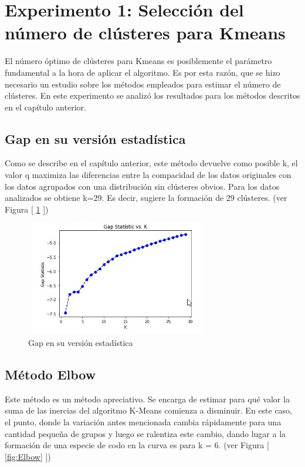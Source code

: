 \section{Experimento 1: Selección del número de clústeres para Kmeans}\label{Experimento1}
El número óptimo de clústeres para Kmeans es posiblemente el parámetro fundamental a la hora de aplicar el algoritmo. Es por esta razón, que se hizo necesario un estudio sobre los métodos empleados para estimar el número de clústeres. En este experimento se analizó los resultados para los métodos descritos en el capítulo anterior.

\subsection{Gap en su versión estadística}
Como se describe en el capítulo anterior, este método devuelve como posible k, el valor q maximiza las diferencias entre la compacidad de los datos originales con los datos agrupados con una distribución sin clústeres obvios. Para los datos analizados se obtiene k=29. Es decir, sugiere la formación de 29 clústeres. (ver Figura [ \ref*{fig:Gap} ])


\begin{figure}[h!]
	\centering
	\includegraphics[width=8cm, height=5cm]{Images/Gap_Static.jpg} 
	\caption{Gap en su versión estadística }
	\label{fig:Gap}
\end{figure}

\subsection{Método Elbow}
Este método es un método apreciativo. Se encarga de estimar para qué valor la suma de las inercias del algoritmo K-Means comienza a disminuir. En este caso, el punto, donde la variación antes mencionada cambia rápidamente para una cantidad pequeña de grupos y luego se ralentiza este cambio, dando lugar a la formación de una especie de codo en la curva es para k = 6. (ver Figura [ \ref*{fig:Elbow} ])

